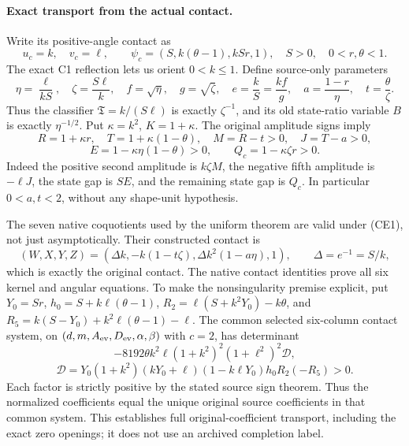 \paragraph{Exact transport from the actual contact.}
Write its positive-angle contact as
\[
 u_c=k,\quad v_c=\ell,\qquad
 \psi_c=(S,k(\theta-1),kSr,1),\quad
 S>0,\quad 0<r,\theta<1.
\]
The exact C1 reflection lets us orient $0<k\le1$. Define source-only
parameters
\[
 \eta=\frac{\ell}{kS},\quad \zeta=\frac{S\ell}{k},\quad
 f=\sqrt\eta,\quad g=\sqrt\zeta,\quad
 e=\frac{k}{S}=\frac{kf}{g},\quad
 a=\frac{1-r}{\eta},\quad t=\frac\theta\zeta.
                                                               \tag{CE1}
\]
Thus the classifier $\mathfrak T=k/(S\ell)$ is exactly $\zeta^{-1}$,
and its old state-ratio variable $B$ is exactly $\eta^{-1/2}$.
Put $\kappa=k^2$, $K=1+\kappa$. The original amplitude signs imply
\[
 R=1+\kappa r,\quad T=1+\kappa(1-\theta),\quad
 M=R-t>0,\quad J=T-a>0,
\]
\[
 E=1-\kappa\eta(1-\theta)>0,\qquad
 Q_c=1-\kappa\zeta r>0.                              \tag{CE2}
\]
Indeed the positive second amplitude is $k\zeta M$, the negative
fifth amplitude is $-\ell J$, the state gap is $SE$, and the remaining
state gap is $Q_c$. In particular $0<a,t<2$, without any shape-unit
hypothesis.

The seven native coquotients used by the uniform theorem are valid
under (CE1), not just asymptotically. Their constructed contact is
\[
 (W,X,Y,Z)=(\Delta k,-k(1-t\zeta),\Delta k^2(1-a\eta),1),
 \qquad \Delta=e^{-1}=S/k,
\]
which is exactly the original contact. The native contact identities
prove all six kernel and angular equations. To make the nonsingularity
premise explicit, put $Y_0=Sr$, $h_0=S+k\ell(\theta-1)$,
$R_2=\ell(S+k^2Y_0)-k\theta$, and
$R_5=k(S-Y_0)+k^2\ell(\theta-1)-\ell$. The common selected
six-column contact system, on $(d,m,A_{\rm ev},D_{\rm ev},\alpha,\beta)$
with $c=2$, has determinant
\[
 -8192\theta k^2\ell(1+k^2)^2(1+\ell^2)^2\mathcal D,
\]
\[
 \mathcal D=Y_0(1+k^2)(kY_0+\ell)(1-k\ell Y_0)h_0R_2(-R_5)>0.
\]
Each factor is strictly positive by the stated source sign theorem.
Thus the normalized coefficients equal the unique original source
coefficients in that common system. This
establishes full original-coefficient transport, including the exact
zero openings; it does not use an archived completion label.

